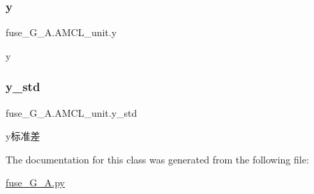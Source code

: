\subsubsection{\texorpdfstring{y}{y}}
{\footnotesize\ttfamily fuse\+\_\+\+G\+\_\+\+A.\+A\+M\+C\+L\+\_\+unit.\+y}



y 

\mbox{\label{classfuse___g___a_1_1_a_m_c_l__unit_ab312d8f6eeaff2878757a6cdc65f84e4}} 
\subsubsection{\texorpdfstring{y\+\_\+std}{y\_std}}
{\footnotesize\ttfamily fuse\+\_\+\+G\+\_\+\+A.\+A\+M\+C\+L\+\_\+unit.\+y\+\_\+std}



y标准差 



The documentation for this class was generated from the following file\+:\begin{DoxyCompactItemize}
\item 
\hyperlink{fuse___g___a_8py}{fuse\+\_\+\+G\+\_\+\+A.\+py}\end{DoxyCompactItemize}
